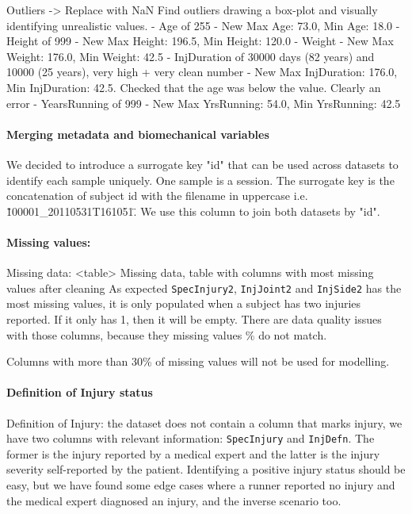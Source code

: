 Outliers -> Replace with NaN
Find outliers drawing a box-plot and visually identifying unrealistic values.
- Age of 255 - New Max Age: 73.0, Min Age: 18.0
- Height of 999 - New Max Height: 196.5, Min Height: 120.0
- Weight - New Max Weight: 176.0, Min Weight: 42.5
- InjDuration of 30000 days (82 years) and 10000 (25 years), very high + very clean number - New Max InjDuration: 176.0, Min InjDuration: 42.5. Checked that the age was below the value. Clearly an error
- YearsRunning of 999 - New Max YrsRunning: 54.0, Min YrsRunning: 42.5

\paragraph{Merging metadata and biomechanical variables}
We decided to introduce a surrogate key "id" that can be used across datasets to identify each sample uniquely. One sample is a session. The surrogate key is the concatenation of subject id with the filename in uppercase i.e. \"100001\_20110531T161051\". We use this column to join both datasets by "id".



\paragraph{Missing values:}
Missing data:
<table> Missing data, table with columns with most missing values after cleaning
As expected \texttt{SpecInjury2}, \texttt{InjJoint2} and \texttt{InjSide2} has the most missing values, it is only populated when a subject has two injuries reported. If it only has 1, then it will be empty. There are data quality issues with those columns, because they missing values \% do not match.

Columns with more than 30\% of missing values will not be used for modelling.


\paragraph{Definition of Injury status}
Definition of Injury: the dataset does not contain a column that marks injury, we have two columns with relevant information: \texttt{SpecInjury} and \texttt{InjDefn}. The former is the injury reported by a medical expert and the latter is the injury severity self-reported by the patient. Identifying a positive injury status should be easy, but we have found some edge cases where a runner reported no injury and the medical expert diagnosed an injury, and the inverse scenario too.

